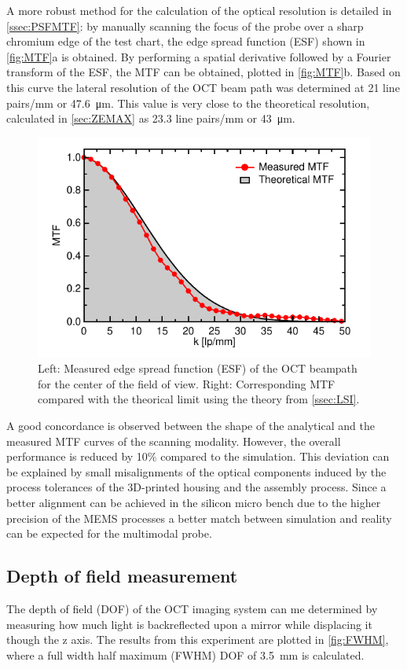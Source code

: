 \documentclass[10pt]{iopart}
\begin{document}
A more robust method for the calculation of the optical resolution is detailed in \autoref{ssec:PSFMTF}: by manually scanning the focus of the probe over a sharp chromium edge of the test chart, the edge spread function (ESF) shown in \autoref{fig:MTF}a is obtained. By performing a spatial derivative followed by a Fourier transform of the ESF, the MTF can be obtained, plotted in \autoref{fig:MTF}b. Based on this curve the lateral resolution of the OCT beam path was determined at 21 line pairs/mm or \SI{47.6}{\micro\meter}. This value is very close to the theoretical resolution, calculated in \autoref{sec:ZEMAX} as 23.3 line pairs/mm or \SI{43}{\micro\meter}.
\begin{figure}[h!]\centering \includegraphics[width=\columnwidth]{figures/confRes.pdf}
      \caption{Left: Measured edge spread function (ESF) of the OCT beampath for the center of the field of view. 
      Right: Corresponding MTF compared with the theorical limit using the theory from \autoref{ssec:LSI}.}
      \label{fig:MTF}
\end{figure}
A good concordance is observed between the shape of the analytical and the measured MTF curves of the scanning modality. However, the overall performance is reduced by 10\% compared to the simulation. This deviation can be explained by small misalignments of the optical components induced by the process tolerances of the 3D-printed housing and the assembly process. Since a better alignment can be achieved in the silicon micro bench due to the higher precision of the MEMS processes a better match between simulation and reality can be expected for the multimodal probe.


\subsection{Depth of field measurement}
The depth of field (DOF) of the OCT imaging system can me determined by measuring how much light is backreflected upon a mirror while displacing it though the z axis. The results from this experiment are plotted in \autoref{fig:FWHM}, where a full width half maximum (FWHM) DOF of \SI{3.5}{\milli\meter} is calculated. 
\end{document}
